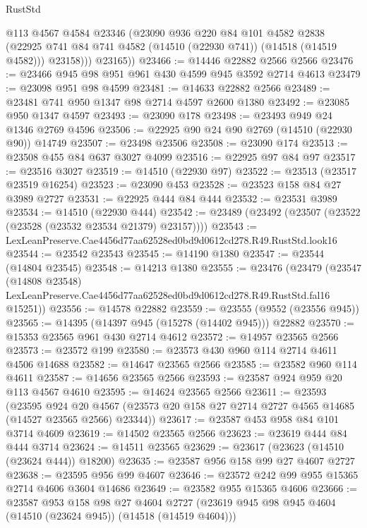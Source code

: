 \begin{lexlean}{RustStd}
\begin{coremodule}
            @113
            @4567
            @4584
            @23346
            (@23090
              @936
              @220
              @84
              @101
              @4582
              @2838
              (@22925 @741 @84 @741 @4582 (@14510 (@22930 @741)) (@14518 (@14519 @4582)))
              @23158)))
        @23165))
@23466 := @14446 @22882 @2566 @2566
@23476 := @23466 @945 @98 @951 @961 @430 @4599 @945 @3592 @2714 @4613
@23479 := @23098 @951 @98 @4599
@23481 := @14633 @22882 @2566
@23489 := @23481 @741 @950 @1347 @98 @2714 @4597 @2600 @1380
@23492 := @23085 @950 @1347 @4597
@23493 := @23090 @178
@23498 := @23493 @949 @24 @1346 @2769 @4596
@23506 := @22925 @90 @24 @90 @2769 (@14510 (@22930 @90)) @14749
@23507 := @23498 @23506
@23508 := @23090 @174
@23513 := @23508 @455 @84 @637 @3027 @4099
@23516 := @22925 @97 @84 @97
@23517 := @23516 @3027
@23519 := @14510 (@22930 @97)
@23522 := @23513 (@23517 @23519 @16254)
@23523 := @23090 @453
@23528 := @23523 @158 @84 @27 @3989 @2727
@23531 := @22925 @444 @84 @444
@23532 := @23531 @3989
@23534 := @14510 (@22930 @444)
@23542 := @23489 (@23492 (@23507 (@23522 (@23528 (@23532 @23534 @21379) @23157))))
@23543 := LexLeanPreserve.Cae4456d77aa62528ed0bd9d0612cd278.R49.RustStd.look16
@23544 := @23542 @23543
@23545 := @14190 @1380
@23547 := @23544 (@14804 @23545)
@23548 := @14213 @1380
@23555 := @23476
    (@23479
      (@23547
        (@14808 @23548)
        LexLeanPreserve.Cae4456d77aa62528ed0bd9d0612cd278.R49.RustStd.fal16
        @15251))
@23556 := @14578 @22882
@23559 := @23555 (@9552 (@23556 @945))
@23565 := @14395 (@14397 @945 (@15278 (@14402 @945))) @22882
@23570 := @15353 @23565 @961 @430 @2714 @4612
@23572 := @14957 @23565 @2566
@23573 := @23572 @199
@23580 := @23573 @430 @960 @114 @2714 @4611 @4506 @14688
@23582 := @14647 @23565 @2566
@23585 := @23582 @960 @114 @4611
@23587 := @14656 @23565 @2566
@23593 := @23587 @924 @959 @20 @113 @4567 @4610
@23595 := @14624 @23565 @2566
@23611 := @23593
    (@23595
      @924
      @20
      @4567
      (@23573 @20 @158 @27 @2714 @2727 @4565 @14685 (@14527 @23565 @2566) @23344))
@23617 := @23587 @453 @958 @84 @101 @3714 @4609
@23619 := @14502 @23565 @2566
@23623 := @23619 @444 @84 @444 @3714
@23624 := @14511 @23565
@23629 := @23617 (@23623 (@14510 (@23624 @444)) @18200)
@23635 := @23587 @956 @158 @99 @27 @4607 @2727
@23638 := @23595 @956 @99 @4607
@23646 := @23572 @242 @99 @955 @15365 @2714 @4606 @3604 @14686
@23649 := @23582 @955 @15365 @4606
@23666 := @23587
    @953
    @158
    @98
    @27
    @4604
    @2727
    (@23619 @945 @98 @945 @4604 (@14510 (@23624 @945)) (@14518 (@14519 @4604)))

\end{coremodule}
\end{lexlean}
